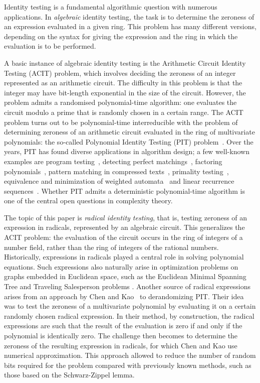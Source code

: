 Identity testing is a fundamental algorithmic question with numerous applications.  In \emph{algebraic} identity testing, the task is to determine the zeroness of an expression evaluated in a given ring.  This problem has many different versions, depending on the syntax for giving the expression and the ring in which the evaluation is to be performed.

A basic instance of algebraic identity testing is the Arithmetic Circuit Identity Testing (ACIT) problem, which involves deciding the zeroness of an integer represented as an arithmetic circuit.  The difficulty in this problem is that the integer may have bit-length exponential in the size of the circuit.  However, the problem admits a randomised polynomial-time algorithm: one evaluates the circuit modulo a prime that is randomly chosen in a certain range.  The ACIT problem turns out to be polynomial-time interreducible with the problem of determining zeroness of an arithmetic circuit evaluated in the  ring of multivariate polynomials: the so-called Polynomial Identity Testing (PIT) problem~\cite{Allender06onthe}.  
Over the years, {PIT} has found diverse applications in algorithm design; a few well-known examples are program testing~\cite{demillo-lipton}, detecting perfect matchings~\cite{lovasz}, factoring polynomials~\cite{kaltofen}, pattern matching in compressed texts~\cite{konig-lohrey, berman-pattern}, primality testing~\cite{agrawal-biswas, aks}, equivalence and minimization of weighted automata~\cite{kiefer-minimize-wa, kiefer-marusic-worrell} and linear recurrence sequences~\cite{COW,abmvv}.
Whether PIT admits a deterministic polynomial-time algorithm is one of the central open questions in complexity theory.

The topic of this paper is \emph{radical identity testing}, that is, testing zeroness of an expression in radicals, represented by an algebraic circuit.
This generalizes the ACIT problem: the evaluation of the circuit occurs in the ring of integers of a number field, rather than the ring of integers of the rational numbers.  Historically, expressions in radicals played a central role in solving polynomial equations.  Such expressions also naturally arise in optimization problems on graphs embedded in Euclidean space, such as the Euclidean Minimal Spanning Tree and Traveling Salesperson problems \cite{ggj}.  Another source of radical expressions arises from an approach by Chen and Kao~\cite{chen-kao} to derandomizing PIT.  Their idea was to test the zeroness of a multivariate polynomial by evaluating it on a certain randomly chosen radical expression.  In their method, by construction, the radical expressions are such that the result of the evaluation is zero if and only if the polynomial is identically zero.  The challenge then becomes to determine the zeroness of the resulting expression in radicals, for which Chen and Kao use numerical approximation.  This approach allowed to reduce the number of random bits required for the problem compared with previously known methods, such as those based on the Schwarz-Zippel lemma.

